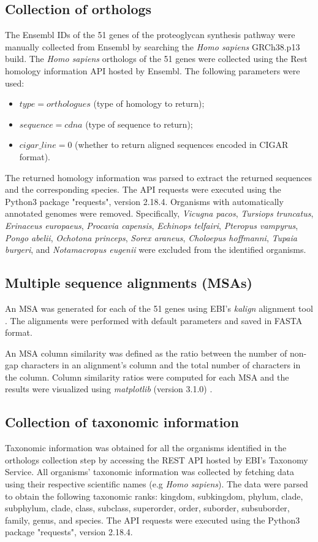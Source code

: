 \documentclass{article}
\begin{document}
\subsection{Collection of orthologs}
The Ensembl IDs of the 51 genes of the proteoglycan synthesis pathway \cite{pg_chapter} were manually collected from Ensembl by searching the \textit{Homo sapiens} GRCh38.p13 build. The \textit{Homo sapiens} orthologs of the 51 genes were collected using the Rest homology information API hosted by Ensembl. The following parameters were used:
\begin{itemize}
	\item $type=orthologues$ (type of homology to return);
	\item $sequence=cdna$ (type of sequence to return);
	\item $cigar\_line=0$ (whether to return aligned sequences encoded in CIGAR format).
\end{itemize}
The returned homology information was parsed to extract the returned sequences and the corresponding species. The API requests were executed using the Python3 package "requests", version 2.18.4. Organisms with automatically annotated genomes were removed. Specifically, \textit{Vicugna pacos}, \textit{Tursiops truncatus}, \textit{Erinaceus europaeus}, \textit{Procavia capensis}, \textit{Echinops telfairi}, \textit{Pteropus vampyrus}, \textit{Pongo abelii}, \textit{Ochotona princeps}, \textit{Sorex araneus}, \textit{Choloepus hoffmanni}, \textit{Tupaia burgeri}, and \textit{Notamacropus eugenii} were excluded from the identified organisms. 

\subsection{Multiple sequence alignments (MSAs)}
An MSA was generated for each of the 51 genes using EBI's \textit{kalign} alignment tool \cite{kalign}. The alignments were performed with default parameters and saved in FASTA format.

An MSA column similarity was defined as the ratio between the number of non-gap characters in an alignment's column and the total number of characters in the column. Column similarity ratios were computed for each MSA and the results were visualized using \textit{matplotlib} (version 3.1.0) \cite{matplotlib}.

\subsection{Collection of taxonomic information}
Taxonomic information was obtained for all the organisms identified in the orthologs collection step by accessing the REST API hosted by EBI's Taxonomy Service. All organisms' taxonomic information was collected by fetching data using their respective scientific names (e.g \textit{Homo sapiens}). The data were parsed to obtain the following taxonomic ranks: kingdom, subkingdom, phylum, clade, subphylum, clade, class, subclass, superorder, order, suborder, subsuborder, family, genus, and species. The API requests were executed using the Python3 package "requests", version 2.18.4.
\end{document}
